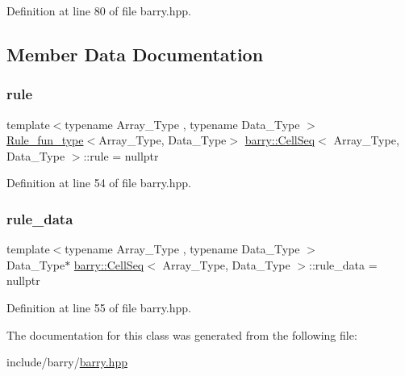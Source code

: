 Definition at line 80 of file barry.\+hpp.



\subsection{Member Data Documentation}
\mbox{\label{classbarry_1_1_cell_seq_a57dfbe0d6e42b3828cb8d0ba8ddc8640}} 
\subsubsection{\texorpdfstring{rule}{rule}}
{\footnotesize\ttfamily template$<$typename Array\+\_\+\+Type , typename Data\+\_\+\+Type $>$ \\
\hyperlink{namespacebarry_aefd7e6d4ba228e2ce1074d075c512178}{Rule\+\_\+fun\+\_\+type}$<$Array\+\_\+\+Type, Data\+\_\+\+Type$>$ \hyperlink{classbarry_1_1_cell_seq}{barry\+::\+Cell\+Seq}$<$ Array\+\_\+\+Type, Data\+\_\+\+Type $>$\+::rule = nullptr\hspace{0.3cm}{\ttfamily [protected]}}



Definition at line 54 of file barry.\+hpp.

\mbox{\label{classbarry_1_1_cell_seq_ad8d6cd5a38746d02d98f4fc8b7624863}} 
\subsubsection{\texorpdfstring{rule\+\_\+data}{rule\_data}}
{\footnotesize\ttfamily template$<$typename Array\+\_\+\+Type , typename Data\+\_\+\+Type $>$ \\
Data\+\_\+\+Type$\ast$ \hyperlink{classbarry_1_1_cell_seq}{barry\+::\+Cell\+Seq}$<$ Array\+\_\+\+Type, Data\+\_\+\+Type $>$\+::rule\+\_\+data = nullptr\hspace{0.3cm}{\ttfamily [protected]}}



Definition at line 55 of file barry.\+hpp.



The documentation for this class was generated from the following file\+:\begin{DoxyCompactItemize}
\item 
include/barry/\hyperlink{barry_8hpp}{barry.\+hpp}\end{DoxyCompactItemize}
